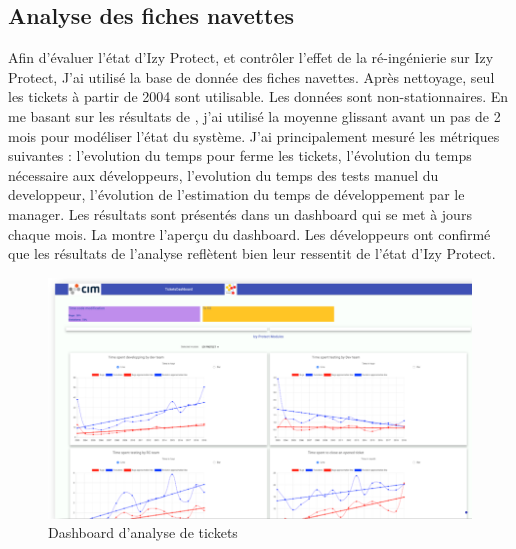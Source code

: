 \documentclass[a4paper]{article}
\begin{document}
\subsection{Analyse des fiches navettes}
\label{sec:analyseDesFichesNavettes}
Afin d'évaluer l'état d'Izy Protect, et contrôler l'effet de la ré-ingénierie sur Izy Protect,
J'ai utilisé la base de donnée des fiches navettes. 
Après nettoyage, seul les tickets à partir de 2004 sont utilisable. 
Les données sont non-stationnaires. 
En me basant sur les résultats de \cite{Raja09}, j'ai utilisé la moyenne glissant avant un pas de 2 mois pour modéliser l'état du système.
J'ai principalement mesuré les métriques suivantes : l'evolution du temps pour ferme les tickets, l'évolution du temps nécessaire aux développeurs, l'evolution du temps des tests manuel du developpeur, l'évolution de l'estimation du temps de développement par le manager.
Les résultats sont présentés dans un dashboard qui se met à jours chaque mois.
La  montre l'aperçu du dashboard.
Les développeurs ont confirmé que les résultats de l'analyse reflètent bien leur ressentit de l'état d'Izy Protect. 

\begin{figure}[htbp]
  \begin{center}
  \includegraphics[width=\textwidth]{./figures/dashboard.png}
  \caption{Dashboard d'analyse de tickets}
  \label{fig:dashboardFig}
\end{center}
\vspace{-0.3cm}
\end{figure}
\end{document}
